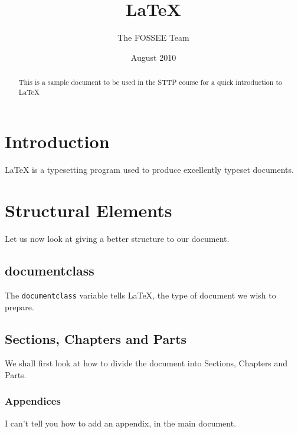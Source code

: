 \documentclass[12pt]{article}
\title{LaTeX}
\author{The FOSSEE Team}
\date{August 2010}
\begin{document}
\maketitle
\tableofcontents

\begin{abstract}
This is a sample document to be used in the STTP course for a quick introduction to \LaTeX
\end{abstract}

\section{Introduction}
LaTeX is a typesetting program used to produce excellently typeset documents.

\section{Structural Elements}
Let us now look at giving a better structure to our document. 

\subsection{documentclass}
The \verb+documentclass+ variable tells \LaTeX, the type of document we wish to prepare. 

\subsection{Sections, Chapters and Parts}
We shall first look at how to divide the document into Sections, Chapters and Parts. 

\subsubsection{Appendices}
I can't tell you how to add an appendix, in the main document. 
\end{document}
